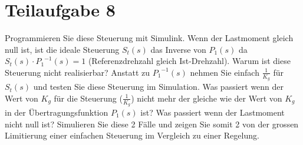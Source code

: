 \section{Teilaufgabe 8}
\begin{aufgabe}
    Programmieren Sie diese Steuerung mit Simulink. Wenn der Lastmoment gleich 
    null ist, ist die ideale Steuerung $S_t(s)$ das Inverse von $P_1(s)$ da 
    $S_t(s) \cdot {P_1}^{-1}(s) = 1$ (Referenzdrehzahl gleich Ist-Drehzahl). 
    Warum ist diese Steuerung nicht realisierbar? Anstatt zu ${P_1}^{-1}(s)$ 
    nehmen Sie einfach $\frac{1}{K_g}$ für $S_t(s)$ und testen Sie diese 
    Steuerung im Simulation.  Was passiert wenn der Wert von $K_g$ für die 
    Steuerung ($\frac{1}{K_g}$) nicht mehr der gleiche wie der Wert von $K_g$ 
    in der Übertragungsfunktion $P_1(s)$ ist? Was passiert wenn der Lastmoment 
    nicht null ist? Simulieren Sie diese 2 Fälle und zeigen Sie somit 2 von 
    der grossen Limitierung einer einfachen Steuerung im Vergleich zu einer 
    Regelung.
\end{aufgabe}
